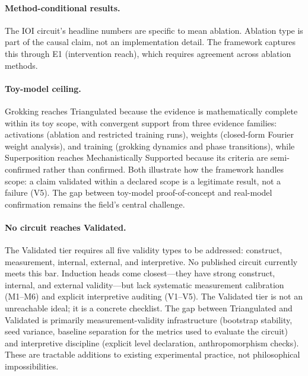 \documentclass{article}
\begin{document}
\paragraph{Method-conditional results.} The IOI circuit's headline numbers are specific to mean ablation. Ablation type is part of the causal claim, not an implementation detail. The framework captures this through E1 (intervention reach), which requires agreement across ablation methods.

\paragraph{Toy-model ceiling.} Grokking reaches Triangulated because the evidence is mathematically complete within its toy scope, with convergent support from three evidence families: activations (ablation and restricted training runs), weights (closed-form Fourier weight analysis), and training (grokking dynamics and phase transitions), while Superposition reaches Mechanistically Supported because its criteria are semi-confirmed rather than confirmed. Both illustrate how the framework handles scope: a claim validated within a declared scope is a legitimate result, not a failure (V5). The gap between toy-model proof-of-concept and real-model confirmation remains the field's central challenge.

\paragraph{No circuit reaches Validated.} The Validated tier requires all five validity types to be addressed: construct, measurement, internal, external, and interpretive. No published circuit currently meets this bar. Induction heads come closest---they have strong construct, internal, and external validity---but lack systematic measurement calibration (M1--M6) and explicit interpretive auditing (V1--V5). The Validated tier is not an unreachable ideal; it is a concrete checklist. The gap between Triangulated and Validated is primarily measurement-validity infrastructure (bootstrap stability, seed variance, baseline separation for the metrics used to evaluate the circuit) and interpretive discipline (explicit level declaration, anthropomorphism checks). These are tractable additions to existing experimental practice, not philosophical impossibilities.
\end{document}

